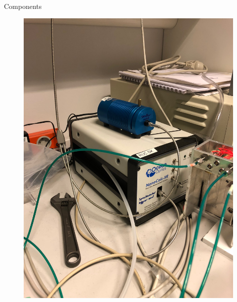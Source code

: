 \documentclass[10pt]{beamer}
\begin{document}
\begin{frame}{Components}
\begin{minipage}{0.5\textwidth}
\begin{figure}
	\includegraphics[scale=0.04,angle=-90]{setup2.JPG}
	\end{figure}
	\end{minipage}

	\end{frame}
	
\end{document}
